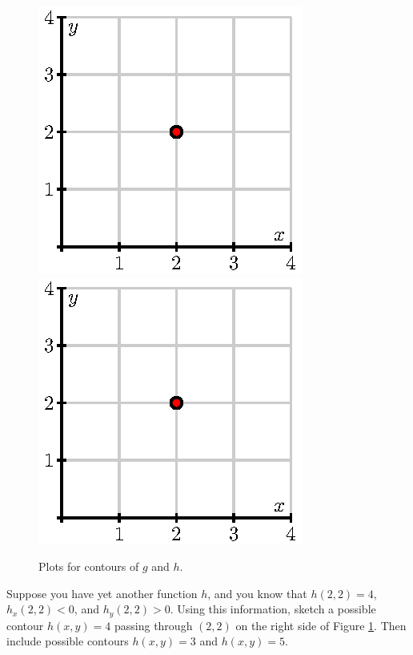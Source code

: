 \begin{activity}
  \begin{figure}[ht]
    \begin{center}
      \includegraphics{figures/fig_10_2_activity_grad.eps}
      \hspace*{1in}
      \includegraphics{figures/fig_10_2_activity_grad.eps}
    \end{center}
    \caption{Plots for contours of $g$ and $h$.}
    \label{F:10.2.activity.grad}
  \end{figure}
\item Suppose you have yet another function $h$, and you know that $h(2,2) =
  4$, $h_x(2,2) < 0$, and $h_y(2,2) > 0$.  Using this information,
  sketch a possible contour $h(x,y)=4$ passing through
  $(2,2)$ on the right side of Figure \ref{F:10.2.activity.grad}.
  Then include possible contours $h(x,y) = 3$ and $h(x,y) = 5$.
    
\ea

\end{activity}


